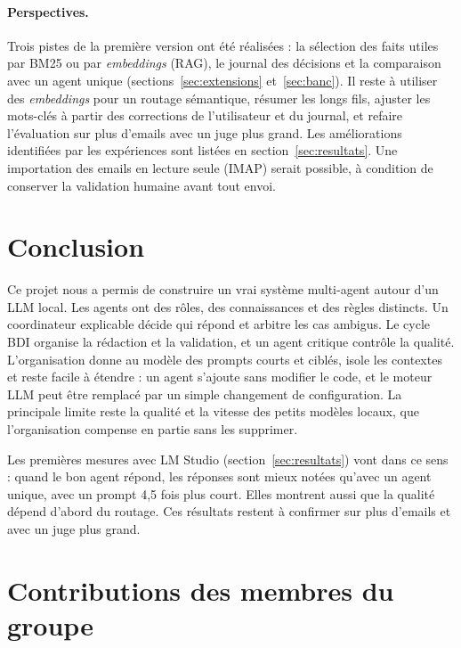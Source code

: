 \documentclass[11pt,a4paper]{article}
\begin{document}
\paragraph{Perspectives.}
Trois pistes de la première version ont été réalisées : la sélection des faits utiles
par BM25 ou par \emph{embeddings} (RAG), le journal des décisions et la comparaison avec
un agent unique (sections~\ref{sec:extensions} et~\ref{sec:banc}). Il reste à utiliser
des \emph{embeddings} pour un routage sémantique, résumer les longs fils, ajuster les
mots-clés à partir des corrections de l'utilisateur et du journal, et refaire
l'évaluation sur plus d'emails avec un juge plus grand. Les améliorations identifiées
par les expériences sont listées en section~\ref{sec:resultats}. Une importation des
emails en lecture seule (IMAP) serait possible, à condition de conserver la validation
humaine avant tout envoi.

\section{Conclusion}

Ce projet nous a permis de construire un vrai système multi-agent autour d'un LLM local.
Les agents ont des rôles, des connaissances et des règles distincts. Un coordinateur
explicable décide qui répond et arbitre les cas ambigus. Le cycle BDI organise la
rédaction et la validation, et un agent critique contrôle la qualité. L'organisation
donne au modèle des prompts courts et ciblés, isole les contextes et reste facile à
étendre : un agent s'ajoute sans modifier le code, et le moteur LLM peut être remplacé
par un simple changement de configuration. La principale limite reste la qualité et la
vitesse des petits modèles locaux, que l'organisation compense en partie sans les supprimer.

Les premières mesures avec LM Studio (section~\ref{sec:resultats}) vont dans ce sens :
quand le bon agent répond, les réponses sont mieux notées qu'avec un agent unique, avec un
prompt 4,5 fois plus court. Elles montrent aussi que la qualité dépend d'abord du
routage. Ces résultats restent à confirmer sur plus d'emails et avec un juge plus grand.

\section{Contributions des membres du groupe}
\end{document}
